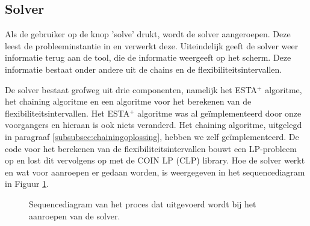 \subsection{Solver}
Als de gebruiker op de knop 'solve' drukt, wordt de solver aangeroepen. Deze leest de probleeminstantie in en verwerkt deze. Uiteindelijk geeft de solver weer informatie terug aan de tool, die de informatie weergeeft op het scherm. Deze informatie bestaat onder andere uit de chains en de flexibiliteitsintervallen.

De solver bestaat grofweg uit drie componenten, namelijk het ESTA$^+$ algoritme, het chaining algoritme en een algoritme voor het berekenen van de flexibiliteitsintervallen. Het ESTA$^+$ algoritme was al ge\"implementeerd door onze voorgangers en hieraan is ook niets veranderd. Het chaining algoritme, uitgelegd in paragraaf \ref{subsubsec:chainingoplossing}, hebben we zelf ge\"implementeerd. De code voor het berekenen van de flexibiliteitsintervallen bouwt een LP-probleem op en lost dit vervolgens op met de COIN LP (CLP) library. Hoe de solver werkt en wat voor aanroepen er gedaan worden, is weergegeven in het sequencediagram in Figuur \ref{fig:sd}.

\newpage
\begin{figure}[H]
\centering

\caption{Sequencediagram van het proces dat uitgevoerd wordt bij het aanroepen van de solver.} 
\label{fig:sd}
\end{figure}

\newpage
